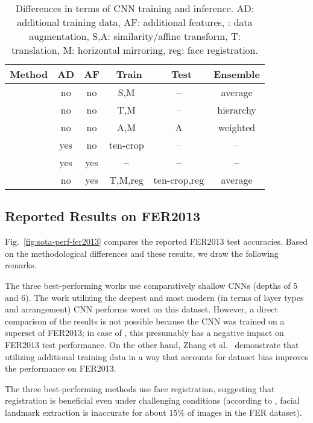 \documentclass[conference,10pt,a4paper]{IEEEtran}
\begin{document}
\begin{table}[t]
\centering
\caption{Differences in terms of CNN training and inference. AD: additional training data, AF: additional features, : data augmentation, S,A: similarity/affine transform, T: translation, M: horizontal mirroring, reg: face registration.}
\label{tbl:sota_train_test}
\begin{tabular}{cccccc}
    \toprule
    Method & AD & AF & ~Train & ~Test & Ensemble \\ \midrule
    \cite{tang13} & no & no & S,M & -- & average \\ 
    \cite{kim16} & no & no & T,M & -- & hierarchy \\ 
    \cite{yu15} & no & no & A,M & A & weighted \\
    \cite{mollahosseini15} & yes & no & ten-crop & -- & -- \\
    \cite{zhang2015} & yes & yes & -- & -- & -- \\
    \cite{kim16cvpr} & no & yes & T,M,reg & ten-crop,reg & average \\
    \bottomrule
\end{tabular}
\end{table}

\subsection{Reported Results on FER2013} \label{sub:reported_results_on_fer2013}

Fig.~\ref{fig:sota-perf-fer2013} compares the reported FER2013 test accuracies. Based on the methodological differences and these results, we draw the following remarks.

The three best-performing works use comparatively shallow CNNs (depths of 5 and 6). The work utilizing the deepest and most modern (in terms of layer types and arrangement) CNN \cite{mollahosseini15} performs worst on this dataset. However, a direct comparison of the results is not possible because the CNN was trained on a superset of FER2013; in case of \cite{mollahosseini15}, this presumably has a negative impact on FER2013 test performance. On the other hand, Zhang et al.\ \cite{zhang2015} demonstrate that utilizing additional training data in a way that accounts for dataset bias improves the performance on FER2013.

The three best-performing methods use face registration, suggesting that registration is beneficial even under challenging conditions (according to \cite{zhang2015}, facial landmark extraction is inaccurate for about 15\% of images in the FER dataset).
\end{document}
